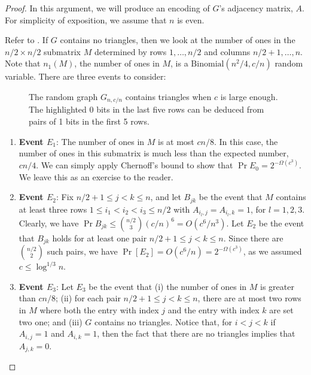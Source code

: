 \documentclass[format=acmsmall, review=false, screen=true]{acmart}
\begin{document}
\begin{proof}
  In this argument, we will produce an encoding of $G$'s adjacency
  matrix, $A$. For simplicity of exposition, we assume that $n$ is
  even.

  Refer to .  If $G$ contains no triangles, then we
  look at the number of ones in the $n/2\times n/2$ submatrix $M$
  determined by rows $1,\ldots,n/2$ and columns $n/2+1,\ldots,n$. Note
  that $n_1(M)$, the number of ones in $M$, is a
  $\mathrm{Binomial}(n^2/4, c/n)$ random variable.  There are three
  events to consider:
  
  \begin{figure}
    \caption{The random graph $G_{n,c/n}$ contains triangles when $c$
      is large enough.  The highlighted 0 bits in the last five rows
      can be deduced from pairs of 1 bits in the first 5 rows.}
  \end{figure}

  \begin{enumerate}
  \item \textbf{Event $E_1$}: The number of ones in $M$ is at most 
     $cn/8$.  In this case,
    the number of ones in this submatrix is much less than the
    expected number, $cn/4$.  
    We can simply apply
    Chernoff's bound to show that $\Pr E_0 = 2^{-\varOmega(c^3)}$.
    We leave this as an exercise to the reader.

  \item \textbf{Event $E_2$}:
    Fix $n/2 + 1 \leq j <  k \leq n$, and let $B_{jk}$ be the event that
    $M$ contains at least three rows $1 \leq i_1 < i_2 < i_{3}
    \leq n/2$ with $A_{i_l, j} = A_{i_l, k} = 1$, for $l = 1, 2, 3$.
    Clearly, we have $\Pr B_{jk} \leq \binom{n/2}{3} (c/n)^{6}
    = O\left(c^{6}/n^{3}\right)$. Let $E_2$ be the event that
    $B_{jk}$ holds for at least one pair $n/2+1 \leq j < k \leq n$.
    Since there are $\binom{n/2}{2}$ such pairs, we have
    $\Pr[E_2] = O(c^{6}/n) = 2^{-\varOmega(c^3)}$, as we
    assumed $c \leq \log^{1/3} n$.
  \item \textbf{Event $E_3$}: Let $E_3$ be the event that (i) 
  the number of ones in $M$ 
   is greater than $cn/8$; (ii)  for each pair $n/2+1 \leq j < k \leq n$,
   there are at most two rows in $M$ where both the entry with
   index $j$ and the entry with index $k$ are set two one; and (iii) $G$
   contains no triangles.
    Notice that, for $i<j<k$ if $A_{i,j}=1$ and $A_{i,k}=1$, then the
    fact that there are no triangles implies that $A_{j,k}=0$.


\end{enumerate}
\end{proof}
\end{document}
